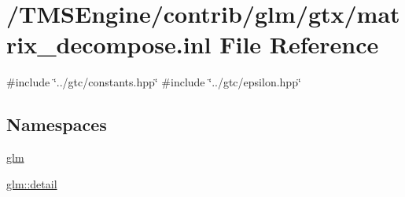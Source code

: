 \hypertarget{matrix__decompose_8inl}{}\section{/\+T\+M\+S\+Engine/contrib/glm/gtx/matrix\+\_\+decompose.inl File Reference}
\label{matrix__decompose_8inl}
{\ttfamily \#include \char`\"{}../gtc/constants.\+hpp\char`\"{}}\newline
{\ttfamily \#include \char`\"{}../gtc/epsilon.\+hpp\char`\"{}}\newline
\subsection*{Namespaces}
\begin{DoxyCompactItemize}
\item 
 \hyperlink{namespaceglm}{glm}
\item 
 \hyperlink{namespaceglm_1_1detail}{glm\+::detail}
\end{DoxyCompactItemize}
